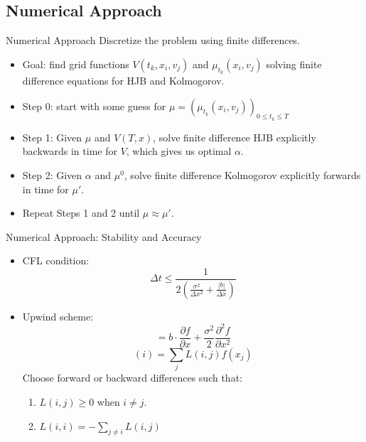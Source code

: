 \documentclass{beamer}
\begin{document}
\subsection{Numerical Approach}

\begin{frame}{Numerical Approach}
	Discretize the problem using finite differences.
	\begin{itemize}
			\item {
				Goal: find grid functions $V(t_k,x_i,v_j)$ and $\mu_{t_k}(x_i,v_j)$ solving finite difference equations for HJB and Kolmogorov.
			}
			\item {
				Step 0: start with some guess for $\mu=(\mu_{t_k}(x_i,v_j))_{0 \leq t_k \leq T}$
			}
			\item {
				Step 1: Given $\mu$ and $V(T,x)$, solve finite difference HJB explicitly backwards in time for $V$, which gives us optimal $\alpha$.
			}
			\item {
				Step 2: Given $\alpha$ and $\mu^0$, solve finite difference Kolmogorov explicitly forwards in time for $\mu '$.
			}
			\item {
				Repeat Steps 1 and 2 until $\mu \approx \mu '$.
			}
	\end{itemize}
\end{frame}

\begin{frame}{Numerical Approach: Stability and Accuracy}
		\begin{itemize}
			\item CFL condition:
			\begin{equation} 
			\Delta t \leq \frac{1}{2(\frac{\sigma^2}{\Delta x^2}+\frac{|b|}{\Delta x})}
			\end{equation}
			\item Upwind scheme:
			\begin{equation}
			[Lf]=b \cdot \frac{\partial f}{\partial x} + \frac{\sigma^2}{2}\frac{\partial^2 f}{\partial x^2}
			\end{equation}
			\begin{equation}
			[Lf](i)=\sum_{j} L(i,j) f(x_j)
			\end{equation}
			Choose forward or backward differences such that:
			\begin{enumerate}
				\item $L(i,j)\geq 0$ when $i \neq j$.
				\item $L(i,i)=-\sum_{j\neq i} L(i,j)$
			\end{enumerate}
			
		\end{itemize}
\end{frame}
	
\end{document}
